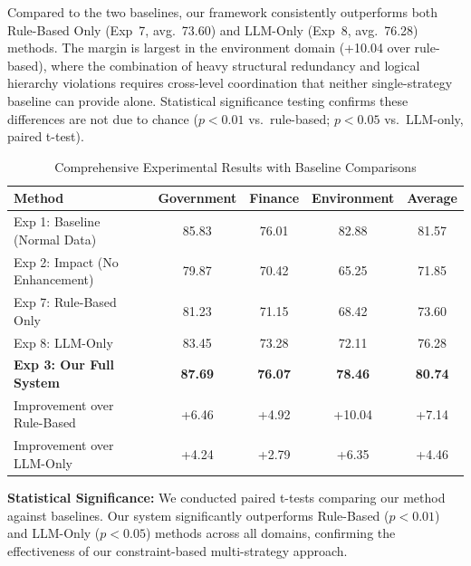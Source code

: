 \documentclass[runningheads]{llncs}
\begin{document}
Compared to the two baselines, our framework consistently outperforms both Rule-Based Only (Exp~7, avg.\ 73.60) and LLM-Only (Exp~8, avg.\ 76.28) methods. The margin is largest in the environment domain (+10.04 over rule-based), where the combination of heavy structural redundancy and logical hierarchy violations requires cross-level coordination that neither single-strategy baseline can provide alone. Statistical significance testing confirms these differences are not due to chance ($p < 0.01$ vs.\ rule-based; $p < 0.05$ vs.\ LLM-only, paired t-test).
\begin{table}[H]
    \centering
    \caption{Comprehensive Experimental Results with Baseline Comparisons}
    \label{tab:comprehensive_results}
    \begin{tabularx}{\textwidth}{l c c c c}
    \toprule
    Method & Government & Finance & Environment & Average \\
    \midrule
    Exp 1: Baseline (Normal Data) & 85.83 & 76.01 & 82.88 & 81.57 \\
    Exp 2: Impact (No Enhancement) & 79.87 & 70.42 & 65.25 & 71.85 \\
    \midrule
    Exp 7: Rule-Based Only & 81.23 & 71.15 & 68.42 & 73.60 \\
    Exp 8: LLM-Only & 83.45 & 73.28 & 72.11 & 76.28 \\
    \textbf{Exp 3: Our Full System} & \textbf{87.69} & \textbf{76.07} & \textbf{78.46} & \textbf{80.74} \\
    \midrule
    Improvement over Rule-Based & +6.46 & +4.92 & +10.04 & +7.14 \\
    Improvement over LLM-Only & +4.24 & +2.79 & +6.35 & +4.46 \\
    \bottomrule
    \end{tabularx}
\end{table}

\textbf{Statistical Significance:} We conducted paired t-tests comparing our method against baselines. Our system significantly outperforms Rule-Based ($p < 0.01$) and LLM-Only ($p < 0.05$) methods across all domains, confirming the effectiveness of our constraint-based multi-strategy approach.
\end{document}
